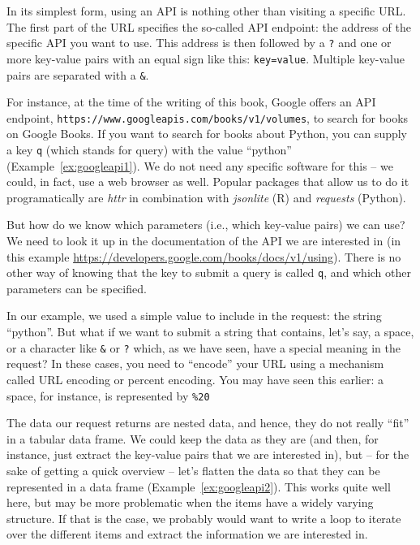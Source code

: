 In its  simplest form, using an API is nothing other than visiting
a specific URL. The first part of the URL specifies the so-called
API endpoint: the address of the specific API you want to use. This
address is then followed by a \verb|?| and one or more key-value pairs with an
equal sign like this: \verb|key=value|. Multiple key-value pairs are
separated with a \texttt{\&}.

For instance, at the time of the writing of this book, Google offers
an API endpoint, \verb|https://www.googleapis.com/books/v1/volumes|, to search for books on Google Books.
If you want to search for books about Python, you can supply a key \verb|q| (which stands for query) with
the value ``python'' (Example~\ref{ex:googleapi1}). We do not need any specific
software for this -- we could, in fact, use a web browser as well.
Popular packages that allow us to do it programatically are \emph{httr}
in combination with \emph{jsonlite} (R) and \emph{requests} (Python).

But how do we know which parameters (i.e., which key-value pairs) we can use?
We need to look it up in the documentation of the API we are
interested in (in this example \url{https://developers.google.com/books/docs/v1/using}).
There is no other way of knowing that the key to submit a query
is called \verb|q|, and which other parameters can be specified.

\begin{feature}
  In our example, we used a simple value to include in the request:
  the string ``python''.  But what if we want to submit a string that
  contains, let's say, a space, or a character like \verb|&| or \verb|?| which,
  as we have seen, have a special meaning in the request? In these
  cases, you need to ``encode'' your URL using a mechanism called URL
  encoding or percent encoding. You may have seen this earlier: a
  space, for instance, is represented by \texttt{\%20}
\end{feature}


The data our request returns are nested data, and hence, they do not
really ``fit'' in a tabular data frame. We could keep the data as they
are (and then, for instance, just extract the key-value pairs that we
are interested in), but -- for the sake of getting a quick overview --
let's flatten the data so that they can be represented in a data frame
(Example~\ref{ex:googleapi2}). This works quite well here, but may be more
problematic when the items have a widely varying structure. If that
is the case, we probably would want to write a loop to iterate
over the different items and extract the information we are interested in.

